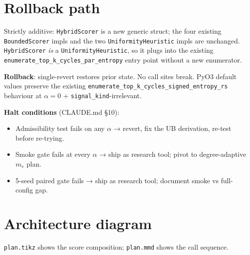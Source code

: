 \documentclass[a4paper,11pt]{article}
\begin{document}
\section*{Rollback path}

Strictly additive: \texttt{HybridScorer} is a new generic struct;
the four existing \texttt{BoundedScorer} impls and the two
\texttt{UniformityHeuristic} impls are unchanged.  \texttt{HybridScorer}
\emph{is} a \texttt{UniformityHeuristic}, so it plugs into the
existing \texttt{enumerate\_top\_k\_cycles\_par\_entropy} entry point
without a new enumerator.

\textbf{Rollback}: single-revert restores prior state.  No call sites
break.  PyO3 default values preserve the existing
\texttt{enumerate\_top\_k\_cycles\_signed\_entropy\_rs} behaviour at
$\alpha = 0$ + \texttt{signal\_kind}-irrelevant.

\textbf{Halt conditions} (CLAUDE.md §10):
\begin{itemize}
  \item Admissibility test fails on any $\alpha$ → revert, fix the UB
    derivation, re-test before re-trying.
  \item Smoke gate fails at every $\alpha$ → ship as research tool;
    pivot to degree-adaptive $m_v$ plan.
  \item 5-seed paired gate fails → ship as research tool; document
    smoke vs full-config gap.
\end{itemize}

\section*{Architecture diagram}

\texttt{plan.tikz} shows the score composition; \texttt{plan.mmd}
shows the call sequence.

\begin{center}

\end{center}
\end{document}
